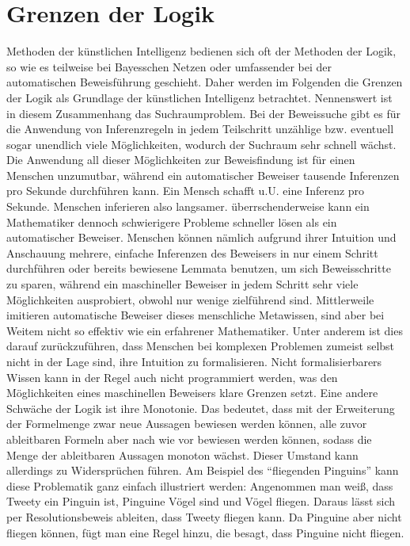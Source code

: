 \section{Grenzen der Logik}
Methoden der künstlichen Intelligenz bedienen sich oft der Methoden der Logik, so wie es teilweise bei Bayesschen Netzen oder umfassender bei der automatischen Beweisführung geschieht.
Daher werden im Folgenden die Grenzen der Logik als Grundlage der künstlichen Intelligenz betrachtet.
Nennenswert ist in diesem Zusammenhang das Suchraumproblem.
Bei der Beweissuche gibt es für die Anwendung von Inferenzregeln in jedem Teilschritt unzählige bzw.
eventuell sogar unendlich viele Möglichkeiten, wodurch der Suchraum sehr schnell wächst.
Die Anwendung all dieser Möglichkeiten zur Beweisfindung ist für einen Menschen unzumutbar, während ein automatischer Beweiser tausende Inferenzen pro Sekunde durchführen kann.
Ein Mensch schafft u.U.
eine Inferenz pro Sekunde.
Menschen inferieren also langsamer.
überrschenderweise kann ein Mathematiker dennoch schwierigere Probleme schneller lösen als ein automatischer Beweiser.
Menschen können nämlich aufgrund ihrer Intuition und Anschauung mehrere, einfache Inferenzen des Beweisers in nur einem Schritt durchführen oder bereits bewiesene Lemmata benutzen, um sich Beweisschritte zu sparen, während ein maschineller Beweiser in jedem Schritt sehr viele Möglichkeiten ausprobiert, obwohl nur wenige zielführend sind.
Mittlerweile imitieren automatische Beweiser dieses menschliche Metawissen, sind aber bei Weitem nicht so effektiv wie ein erfahrener Mathematiker.
Unter anderem ist dies darauf zurückzuführen, dass Menschen bei komplexen Problemen zumeist selbst nicht in der Lage sind, ihre Intuition zu formalisieren.
Nicht formalisierbarers Wissen kann in der Regel auch nicht programmiert werden, was den Möglichkeiten eines maschinellen Beweisers klare Grenzen setzt.
Eine andere Schwäche der Logik ist ihre Monotonie.
Das bedeutet, dass mit der Erweiterung der Formelmenge zwar neue Aussagen bewiesen werden können, alle zuvor ableitbaren Formeln aber nach wie vor bewiesen werden können, sodass die Menge der ableitbaren Aussagen monoton wächst.
Dieser Umstand kann allerdings zu Widersprüchen führen.
Am Beispiel des “fliegenden Pinguins” kann diese Problematik ganz einfach illustriert werden:
Angenommen man weiß, dass Tweety ein Pinguin ist, Pinguine Vögel sind und Vögel fliegen.
Daraus lässt sich per Resolutionsbeweis ableiten, dass Tweety fliegen kann.
Da Pinguine aber nicht fliegen können, fügt man eine Regel hinzu, die besagt, dass Pinguine nicht fliegen.
